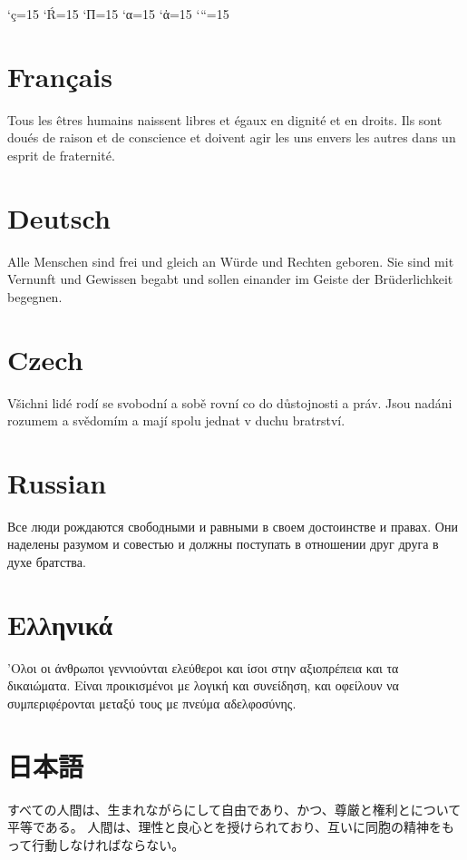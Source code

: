 \documentclass{ujarticle}
\begin{document}
\kcatcode`ç=15%
\kcatcode`Ŕ=15
\kcatcode`П=15
\kcatcode`α=15
\kcatcode`ἀ=15
\kcatcode`“=15

\section{Français}
Tous les êtres humains naissent libres et égaux en dignité et en droits.
Ils sont doués de raison et de conscience et doivent agir les uns envers les autres dans un esprit de fraternité.

\section{Deutsch}
Alle Menschen sind frei und gleich an Würde und Rechten geboren.
Sie sind mit Vernunft und Gewissen begabt und sollen einander im Geiste der Brüderlichkeit begegnen.

%
\section{Czech}
Všichni lidé rodí se svobodní a sobě rovní co do důstojnosti a práv.
Jsou nadáni rozumem a svědomím a mají spolu jednat v duchu bratrství. 

\section{Russian}
\selectfont
Все люди рождаются свободными и равными в своем достоинстве и правах.
Они наделены разумом и совестью и должны поступать в отношении друг друга в духе братства.

\selectfont

\section{Ελληνικά}
'Ολοι οι άνθρωποι γεννιούνται ελεύθεροι και ίσοι στην αξιοπρέπεια και τα δικαιώματα.
Είναι προικισμένοι με λογική και συνείδηση, και οφείλουν να συμπεριφέρονται μεταξύ τους με πνεύμα αδελφοσύνης.

\section{日本語}
すべての人間は、生まれながらにして自由であり、かつ、尊厳と権利とについて平等である。
人間は、理性と良心とを授けられており、互いに同胞の精神をもって行動しなければならない。 
\end{document}
